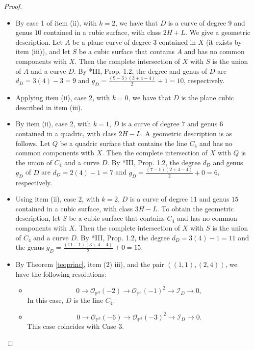 \documentclass[12pt,reqno]{amsart}
\theoremstyle{plain}
\theoremstyle{definition}
\theoremstyle{remark}
\theoremstyle{definition}
\newcommand{\PP}{\mathds{P}}
\newcommand{\PPP}{\PP^{3}}
\newcommand{\ii}{\mathscr{I}}
\newcommand{\oo}{\mathcal{O}}
\begin{document}
\begin{proof}
\begin{itemize}
    \item[Case 3:] By case 1 of item (ii), with $k=2$, we have that $D$ is a curve of degree $9$ and genus $10$ contained in a cubic surface, with class $2H+L$. We give a geometric description. Let $A$ be a plane curve of degree $3$ contained in $X$ (it exists by item (iii)), and let $S$ be a cubic surface that contains $A$ and has no common components with $X$. Then the complete intersection of $X$ with $S$ is the union of $A$ and a curve $D$. By \cite{mdp2}*{III, Prop. 1.2}, the degree and genus of $D$ are $d_{D}=3(4)-3=9$ and $g_{D}=\frac{(9-3)(3+4-4)}{2}+1=10$, respectively.

    \item[Case 4:] Applying item (ii), case 2, with $k=0$, we have that $D$ is the plane cubic described in item (iii).
    
    \item[Case 5:] By item (ii), case 2, with $k=1$, $D$ is a curve of degree $7$ and genus $6$ contained in a quadric, with class $2H-L$. A geometric description is as follows. Let $Q$ be a quadric surface that contains the line $C_{4}$ and has no common components with $X$. Then the complete intersection of $X$ with $Q$ is the union of $C_{4}$ and a curve $D$. By \cite{mdp2}*{III, Prop. 1.2}, the degree $d_{D}$ and genus $g_{D}$ of $D$ are $d_{D}=2(4)-1=7$ and $g_{D}=\frac{(7-1)(2+4-4)}{2}+0=6$, respectively.
    
    \item[Case 6:] Using item (ii), case 2, with $k=2$, $D$ is a curve of degree $11$ and genus $15$ contained in a cubic surface, with class $3H-L$. To obtain the geometric description, let $S$ be a cubic surface that contains $C_{4}$ and has no common components with $X$. Then the complete intersection of $X$ with $S$ is the union of $C_{4}$ and a curve $D$. By \cite{mdp2}*{III, Prop. 1.2}, the degree $d_{D}=3(4)-1=11$ and the genus $g_{D}=\frac{(11-1)(3+4-4)}{2}+0=15$.
    
    \item[Case 7:] By Theorem \ref{teoprinc}, item (2) iii), and the pair $((1,1),(2,4))$, we have the following resolutions:
    \begin{itemize}
        \item $$0\to \oo_{\PPP}(-2) \to \oo_{\PPP}(-1)^{2} \to \ii_{D}\to 0,$$
        In this case, $D$ is the line $C_{4}$.
        \item $$0\to \oo_{\PPP}(-6) \to \oo_{\PPP}(-3)^{2} \to \ii_{D}\to 0.$$
        This case coincides with Case 3.
    \end{itemize} 


\end{itemize}
\end{proof}
\end{document}

